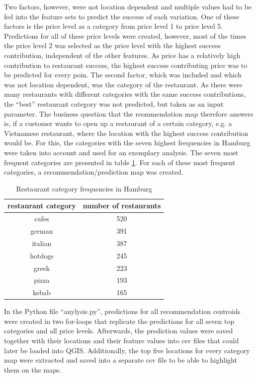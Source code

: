 \documentclass[a4paper, 11pt, oneside]{Thesis}  %
\begin{document}
Two factors, however, were not location dependent and multiple values had to be fed into the feature sets to predict the success of each variation. One of these factors is the price level as a category from price level 1 to price level 5. Predictions for all of these price levels were created, however, most of the times the price level 2 was selected as the price level with the highest success contribution, independent of the other features. As price has a relatively high contribution to restaurant success, the highest success contributing price was to be predicted for every poin. The second factor, which was included and which was not location dependent, was the category of the restaurant. As there were many restaurants with different categories with the same success contributions, the ``best'' restaurant category was not predicted, but taken as an input parameter. The business question that the reommendation map therefore answers is, if a customer wants to open up a restaurant of a certain category, e.g. a Vietnamese restaurant, where the location with the highest success contribution would be. For this, the categories with the seven highest frequencies in Hamburg were taken into account and used for an exemplary analysis. The seven most frequent categories are presented in table \ref{table:category_frequencies}. For each of these most frequent categories, a recommendation/prediction map was created.

\begin{table}[h!]
\begin{center}
\begin{tabular}{| c | c |}
\hline
 restaurant category & number of restaurants \\
 \hline
 cafes & 520 \\ 
 german & 391 \\  
 italian & 387 \\    
 hotdogs & 245 \\
 greek & 223 \\
 pizza & 193 \\
 kebab & 165 \\
 \hline
\end{tabular}
\caption{Restaurant category frequencies in Hamburg}
\label{table:category_frequencies}
\end{center}
\end{table}

In the Python file ``anylysis.py'', predictions for all recommendation centroids were created in two for-loops that replicate the predictions for all seven top categories and all price levels. Afterwards, the prediction values were saved together with their locations and their feature values into \ac{csv} files that could later be loaded into QGIS. Additionally, the top five locations for every category map were extracted and saved into a separate \ac{csv} file to be able to highlight them on the maps.
\end{document}
